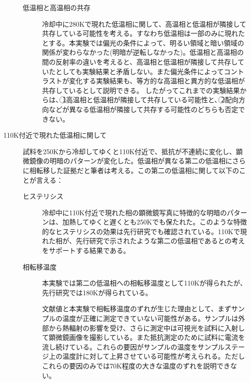 \begin{description}
\begin{description}
\item[低温相と高温相の共存]
冷却中に280Kで現れた低温相に関して、高温相と低温相が隣接して共存している可能性を考える。すなわち低温相は一部のみに現れたとする。本実験では偏光の条件によって、明るい領域と暗い領域の関係が変わらなかった(明暗が逆転しなかった)。低温相と高温相の間の反射率の違いを考えると、高温相と低温相が隣接して共存していたとしても実験結果と矛盾しない。また偏光条件によってコントラストが変化する実験結果も、等方的な高温相と異方的な低温相が共存しているとして説明できる。
したがってこれまでの実験結果からは、\textcircled{\scriptsize 1}高温相と低温相が隣接して共存している可能性と、\textcircled{\scriptsize 2}配向方向などが異なる低温相が隣接して共存する可能性のどちらも否定できない。

\end{description}

\item[110K付近で現れた低温相に関して]
\item[]
試料を250Kから冷却してゆくと110K付近で、抵抗が不連続に変化し、顕微鏡像の明暗のパターンが変化した。低温相が異なる第二の低温相にさらに相転移した証拠だと筆者は考える。この第二の低温相に関して以下のことが言える：

\begin{description}
\item[ヒステリシス]
冷却中に110K付近で現れた相の顕微鏡写真に特徴的な明暗のパターンは、加熱してゆくと遅くとも250Kでも保たれた。このような特徴的なヒステリシスの効果は先行研究\cite{IrTe_TT3,IrTe_TT4}でも確認されている。110Kで現れた相が、先行研究で示されたような第二の低温相であるとの考えをサポートする結果である。
 
 \item[相転移温度]
 本実験では第二の低温相への相転移温度として110Kが得られたが、先行研究では180K\cite{IrTe_TT1,IrTe_TT2,IrTe_TT3,IrTe_TT4}が得られている。
 
文献値と本実験で相転移温度のずれが生じた理由として、まずサンプルの温度が正確に測定できていない可能性がある。サンプルは外部から熱輻射の影響を受け、さらに測定中は可視光を試料に入射して顕微鏡画像を撮影している。また抵抗測定のために試料に電流を流し続けている。これらの要因がサンプルの温度をサンプルステージ上の温度計に対して上昇させている可能性が考えられる。ただしこれらの要因のみでは70K程度の大きな温度のずれを説明できない。
 

\end{description}
\end{description}

